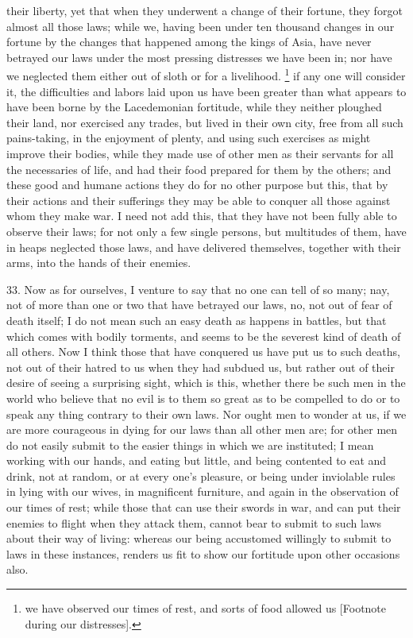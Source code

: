 their liberty, yet that when they underwent a change of their fortune,
they forgot almost all those laws; while we, having been under ten
thousand changes in our fortune by the changes that happened among the
kings of Asia, have never betrayed our laws under the most pressing
distresses we have been in; nor have we neglected them either out of sloth
or for a livelihood. \footnote{we have observed our
times of rest, and sorts of food allowed us [Footnote during our
distresses].} if any one will consider it,
the difficulties and labors laid upon us have been greater than what
appears to have been borne by the Lacedemonian fortitude, while they
neither ploughed their land, nor exercised any trades, but lived in their
own city, free from all such pains-taking, in the enjoyment of plenty, and
using such exercises as might improve their bodies, while they made use of
other men as their servants for all the necessaries of life, and had their
food prepared for them by the others; and these good and humane actions
they do for no other purpose but this, that by their actions and their
sufferings they may be able to conquer all those against whom they make
war. I need not add this, that they have not been fully able to observe
their laws; for not only a few single persons, but multitudes of them,
have in heaps neglected those laws, and have delivered themselves,
together with their arms, into the hands of their enemies.

33. Now as for ourselves, I venture to say that no one can tell of so
many; nay, not of more than one or two that have betrayed our laws, no,
not out of fear of death itself; I do not mean such an easy death as
happens in battles, but that which comes with bodily torments, and seems
to be the severest kind of death of all others. Now I think those that
have conquered us have put us to such deaths, not out of their hatred to
us when they had subdued us, but rather out of their desire of seeing a
surprising sight, which is this, whether there be such men in the world
who believe that no evil is to them so great as to be compelled to do or
to speak any thing contrary to their own laws. Nor ought men to wonder at
us, if we are more courageous in dying for our laws than all other men
are; for other men do not easily submit to the easier things in which we
are instituted; I mean working with our hands, and eating but little, and
being contented to eat and drink, not at random, or at every one's
pleasure, or being under inviolable rules in lying with our wives, in
magnificent furniture, and again in the observation of our times of rest;
while those that can use their swords in war, and can put their enemies to
flight when they attack them, cannot bear to submit to such laws about
their way of living: whereas our being accustomed willingly to submit to
laws in these instances, renders us fit to show our fortitude upon other
occasions also.

